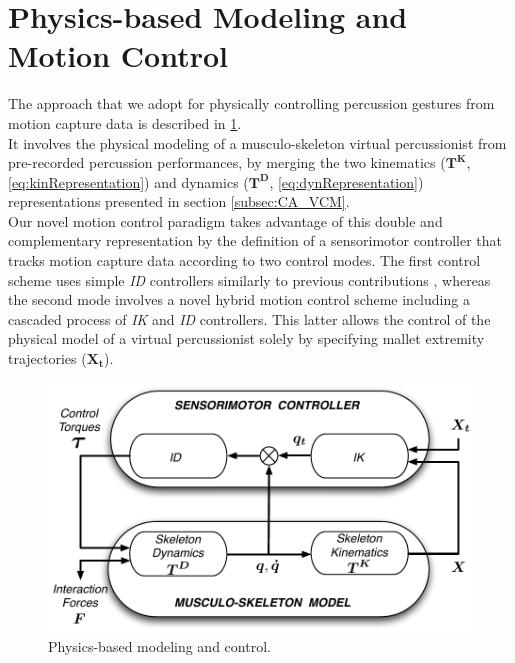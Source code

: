 
	\section{Physics-based Modeling and Motion Control}
	\label{sec:Synthesis_Physics}

The approach that we adopt for physically controlling percussion gestures from motion capture data is described in \myfigname \ref{fig:modelControl}.\\

It involves the physical modeling of a musculo-skeleton virtual percussionist from pre-recorded percussion performances, by merging the two kinematics ($\boldsymbol{T^K}$, \myequname \eqref{eq:kinRepresentation}) and dynamics ($\boldsymbol{T^D}$, \myequname \eqref{eq:dynRepresentation}) representations presented in section \ref{subsec:CA_VCM}.\\

Our novel motion control paradigm takes advantage of this double and complementary representation by the definition of a sensorimotor controller that tracks motion capture data according to two control modes. The first control scheme uses simple \emph{ID} controllers similarly to previous contributions , whereas the second mode involves a novel hybrid motion control scheme including a cascaded process of \emph{IK} and \emph{ID} controllers. This latter allows the control of the physical model of a virtual percussionist solely by specifying mallet extremity trajectories ($\boldsymbol{X_t}$).

\begin{figure}%
	\centering
	\includegraphics[width=0.7\linewidth]{Chapters/5/Pics/Pdf/IK-ID-Control.pdf}
	\caption[Physics-based modeling and control]{Physics-based modeling and control.}
	\label{fig:modelControl}
\end{figure}


